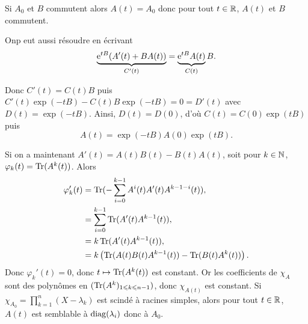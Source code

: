\documentclass[12pt]{article}
\begin{document}
\begin{remark}
	Si $A_0$ et $B$ commutent alors $A(t)=A_0$ donc pour tout $t\in\mathbb{R}$, $A(t)$ et $B$ commutent.
\end{remark}

\begin{remark}
	Onp eut aussi résoudre en écrivant 
	\begin{equation*}
		\underbrace{\mathrm{e}^{tB}(A'(t)+BA(t))}_{C'(t)}=\underbrace{\mathrm{e}^{tB}A(t)}_{C(t)}B.
	\end{equation*}

	Donc $C'(t)=C(t)B$ puis $C'(t)\exp(-tB)-C(t)B\exp(-tB)=0=D'(t)$ avec $D(t)=\exp(-tB)$. Ainsi, $D(t)=D(0)$, d'où $C(t)=C(0)\exp(tB)$ puis 
	\begin{equation*}
		A(t)=\exp(-tB)A(0)\exp(tB).
	\end{equation*}
\end{remark}

\begin{remark}
	Si on a maintenant $A'(t)=A(t)B(t)-B(t)A(t)$, soit pour $k\in\mathbb{N}$, $\varphi_k(t)=\operatorname{Tr}(A^{k}(t))$. Alors 
	\begin{align*}
		\varphi_k'(t)
		&=\operatorname{Tr}(-\sum_{i=0}^{k-1}A^{i}(t)A'(t)A^{k-1-i}(t)),\\
		&=\sum_{i=0}^{k-1}\operatorname{Tr}(A'(t)A^{k-1}(t)),\\
		&=k\operatorname{Tr}(A'(t)A^{k-1}(t)),\\
		&=k\left(\operatorname{Tr}(A(t)B(t)A^{k-1}(t))-\operatorname{Tr}(B(t)A^{k}(t))\right).
	\end{align*}
	Donc $\varphi_k'(t)=0$, donc $t\mapsto\operatorname{Tr}(A^{k}(t))$ est constant. Or les coefficients de $\chi_{A}$ sont des polynômes en $(\operatorname{Tr}(A^{k})_{1\leqslant k\leqslant n-1})$, donc $\chi_{A(t)}$ est constant. Si $\chi_{A_{0}}=\prod_{k=1}^{n}(X-\lambda_k)$ est scindé à racines simples, alors pour tout $t\in\mathbb{R}$, $A(t)$ est semblable à $\operatorname{diag}(\lambda_i)$ donc à $A_0$.
\end{remark}
\end{document}
